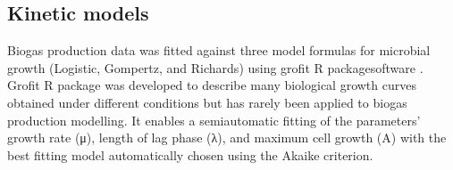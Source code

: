 \subsection{Kinetic models}
Biogas production data was fitted against three model formulas for microbial growth (Logistic, Gompertz, and Richards) using grofit R packagesoftware \cite{Kahm_2010}. Grofit R package was developed to describe many biological growth curves obtained under different conditions but has rarely been applied to biogas production modelling. It enables a semiautomatic fitting of the parameters’ growth rate (μ), length of lag phase (λ), and maximum cell growth (A) with the best fitting model automatically chosen using the Akaike criterion.